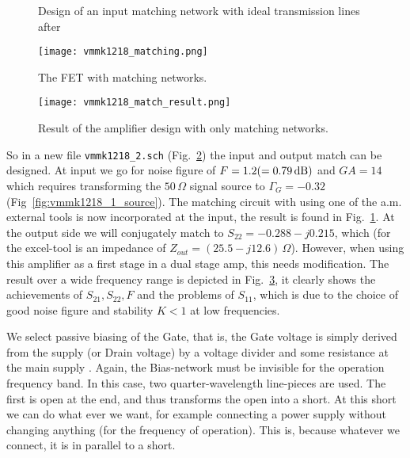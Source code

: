 \begin{figure}
  \centering
  \caption{Design of an input matching network with ideal transmission
    lines after \cite{ibdrigodwn}}
  \label{fig:vmmk1218_input_match}
\end{figure}

\begin{figure}
  \centering
  {\texttt{[image: vmmk1218\_matching.png]}}
  \caption{The FET with matching networks.}
  \label{fig:vmmk1218_matching}
\end{figure}

\begin{figure}
  \centering
  {\texttt{[image: vmmk1218\_match\_result.png]}}
  \caption{Result of the amplifier design with only matching networks.}
  \label{fig:vmmk1218_match_result}
\end{figure}

So in a new file \texttt{vmmk1218\_2.sch}
(Fig.~\ref{fig:vmmk1218_matching}) the input and output match can be
designed. At input we go for noise figure of $F=1.2(=0.79\,\mathrm{dB})$
and $GA=14$ which requires transforming the $50\,\Omega$ signal source
to $\Gamma_G=-0.32$ (Fig~\ref{fig:vmmk1218_1_source}). The matching
circuit with using one of the a.m. external tools is now incorporated
at the input, the result is found in
Fig.~\ref{fig:vmmk1218_input_match}. At the output side we will
conjugately match to $S_{22}=-0.288-j0.215$, which (for the excel-tool
is an impedance of $Z_{out}=(25.5-j12.6)\,\Omega$). However, when
using this amplifier as a first stage in a dual stage amp, this needs
modification. The result over a wide frequency range is depicted in
Fig.~\ref{fig:vmmk1218_match_result}, it clearly shows the achievements
of $S_{21},S_{22}, F$ and the problems of $S_{11}$, which is due to
the choice of good noise figure and stability $K<1$ at low
frequencies.

\label{ch:bias1}

We select passive biasing of the Gate, that is, the Gate voltage is
simply derived from the supply (or Drain voltage) by a voltage divider
and some resistance at the main supply \cite{avago_an5385}. Again, the
Bias-network must be invisible for the operation frequency band. In
this case, two quarter-wavelength line-pieces are used. The first is
open at the end, and thus transforms the open into a short. At this
short we can do what ever we want, for example connecting a power
supply without changing anything (for the frequency of
operation). This is, because whatever we connect, it is in parallel to
a short. 

